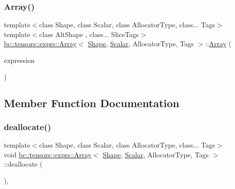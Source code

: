 \subsubsection{\texorpdfstring{Array()}{Array()}\hspace{0.1cm}{\footnotesize\ttfamily [9/9]}}
{\footnotesize\ttfamily template$<$class Shape, class Scalar, class Allocator\+Type, class... Tags$>$ \\
template$<$class Alt\+Shape , class... Slice\+Tags$>$ \\
\hyperlink{structbc_1_1tensors_1_1exprs_1_1Array}{bc\+::tensors\+::exprs\+::\+Array}$<$ \hyperlink{structbc_1_1Shape}{Shape}, \hyperlink{namespacebc_aa12ac55ee2c43dc082894dd3859daee1}{Scalar}, Allocator\+Type, Tags $>$\+::\hyperlink{structbc_1_1tensors_1_1exprs_1_1Array}{Array} (\begin{DoxyParamCaption}\item[{const \hyperlink{classbc_1_1tensors_1_1exprs_1_1Array__Slice}{Array\+\_\+\+Slice}$<$ Alt\+Shape, \hyperlink{structbc_1_1Shape_a52aafd6585a5eae8a3b82f650d3afc1c}{value\+\_\+type}, \hyperlink{structbc_1_1tensors_1_1exprs_1_1Array_a990afcebe8817075d427f2653d197140}{allocator\+\_\+type}, Slice\+Tags... $>$ \&}]{expression }\end{DoxyParamCaption})\hspace{0.3cm}{\ttfamily [inline]}}



\subsection{Member Function Documentation}
\mbox{\label{structbc_1_1tensors_1_1exprs_1_1Array_a3123e9466102d458b8bcf48bd926559c}} 
\subsubsection{\texorpdfstring{deallocate()}{deallocate()}}
{\footnotesize\ttfamily template$<$class Shape, class Scalar, class Allocator\+Type, class... Tags$>$ \\
void \hyperlink{structbc_1_1tensors_1_1exprs_1_1Array}{bc\+::tensors\+::exprs\+::\+Array}$<$ \hyperlink{structbc_1_1Shape}{Shape}, \hyperlink{namespacebc_aa12ac55ee2c43dc082894dd3859daee1}{Scalar}, Allocator\+Type, Tags $>$\+::deallocate (\begin{DoxyParamCaption}{ }\end{DoxyParamCaption})\hspace{0.3cm}{\ttfamily [inline]}, {\ttfamily [protected]}}

